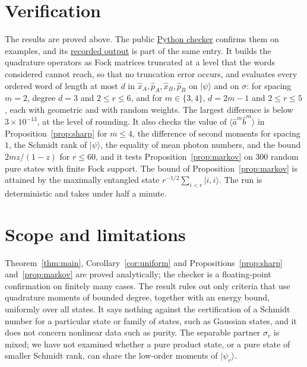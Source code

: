 \documentclass[11pt,a4paper]{article}
\theoremstyle{definition}
\theoremstyle{plain}
\newcommand{\ket}[1]{\lvert#1\rangle}
\begin{document}
\section{Verification}\label{sec:verification}
The results are proved above. The public
\href{https://github.com/jpbruneton/open_quantum_problems/blob/main/research/entries/schmidt-number-separable-covariance/checks/verify_moments.py}{Python checker}
confirms them on examples, and its
\href{https://github.com/jpbruneton/open_quantum_problems/blob/main/research/entries/schmidt-number-separable-covariance/data/verification.json}{recorded output}
is part of the same entry. It builds the quadrature operators as Fock matrices
truncated at a level that the words considered cannot reach, so that no
truncation error occurs, and evaluates every ordered word of length at most
$d$ in $\hat x_A,\hat p_A,\hat x_B,\hat p_B$ on $\ket\psi$ and on $\sigma$: for
spacing $m=2$, degree $d=3$ and $2\le r\le6$, and for $m\in\{3,4\}$,
$d=2m-1$ and $2\le r\le5$, each with geometric and with random weights. The
largest difference is below $3\times10^{-13}$, at the level of rounding. It
also checks the value of $\langle\hat a^m\hat b^m\rangle$ in
Proposition~\ref{prop:sharp} for $m\le4$, the difference of second moments for
spacing $1$, the Schmidt rank of $\ket\psi$, the equality of mean photon
numbers, and the bound $2mz/(1-z)$ for $r\le60$, and it tests
Proposition~\ref{prop:markov} on $300$ random pure states with finite Fock
support. The bound of Proposition~\ref{prop:markov} is attained by the
maximally entangled state $r^{-1/2}\sum_{i<r}\ket{i,i}$. The run is deterministic and
takes under half a minute.

\section{Scope and limitations}\label{sec:scope}
Theorem~\ref{thm:main}, Corollary~\ref{cor:uniform} and
Propositions~\ref{prop:sharp} and~\ref{prop:markov} are proved analytically;
the checker is a floating-point confirmation on finitely many cases. The
result rules out only criteria that use quadrature moments of bounded degree,
together with an energy bound, uniformly over all states. It says nothing
against the certification of a Schmidt number for a particular state or family
of states, such as Gaussian states, and it does not concern nonlinear data
such as purity. The separable partner $\sigma_r$ is
mixed; we have not examined whether a pure product state, or a pure state of
smaller Schmidt rank, can share the low-order moments of $\ket{\psi_r}$.
\end{document}
